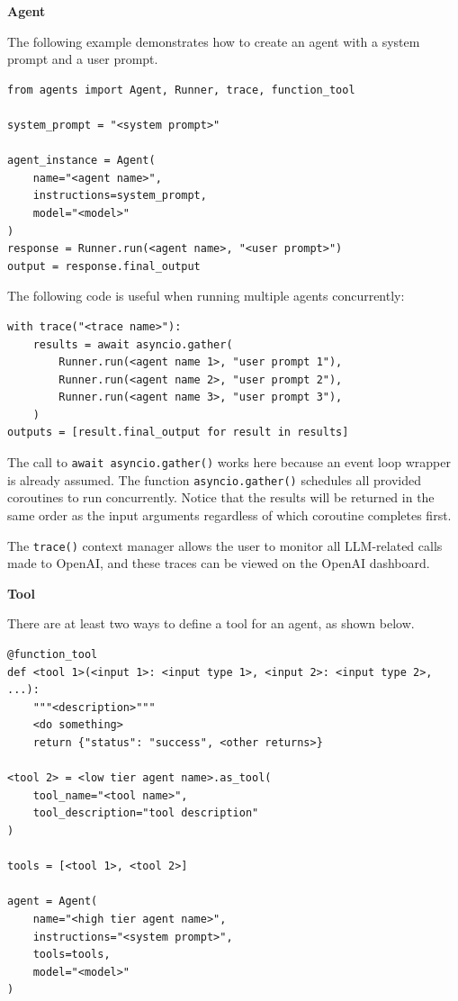\vspace{0.1in}
\noindent \textbf{Agent}
\vspace{0.1in}

The following example demonstrates how to create an agent with a system prompt and a user prompt.

\begin{lstlisting}
from agents import Agent, Runner, trace, function_tool

system_prompt = "<system prompt>"

agent_instance = Agent(
    name="<agent name>",
    instructions=system_prompt,
    model="<model>"
)
response = Runner.run(<agent name>, "<user prompt>")
output = response.final_output
\end{lstlisting}

The following code is useful when running multiple agents concurrently:
\begin{lstlisting}
with trace("<trace name>"):
    results = await asyncio.gather(
        Runner.run(<agent name 1>, "user prompt 1"),
        Runner.run(<agent name 2>, "user prompt 2"),
        Runner.run(<agent name 3>, "user prompt 3"),
    )
outputs = [result.final_output for result in results]
\end{lstlisting}

The call to \texttt{await asyncio.gather()} works here because an event loop wrapper is already assumed. The function \texttt{asyncio.gather()} schedules all provided coroutines to run concurrently. Notice that the results will be returned in the same order as the input arguments regardless of which coroutine completes first. 

The \verb|trace()| context manager allows the user to monitor all LLM-related calls made to OpenAI, and these traces can be viewed on the OpenAI dashboard.

\vspace{0.1in}
\noindent \textbf{Tool}
\vspace{0.1in}

There are at least two ways to define a tool for an agent, as shown below.

\begin{lstlisting}
@function_tool
def <tool 1>(<input 1>: <input type 1>, <input 2>: <input type 2>, ...):
    """<description>"""
    <do something>
    return {"status": "success", <other returns>}

<tool 2> = <low tier agent name>.as_tool(
    tool_name="<tool name>",
    tool_description="tool description"
)

tools = [<tool 1>, <tool 2>]

agent = Agent(
    name="<high tier agent name>",
    instructions="<system prompt>",
    tools=tools,
    model="<model>"
)
\end{lstlisting}

